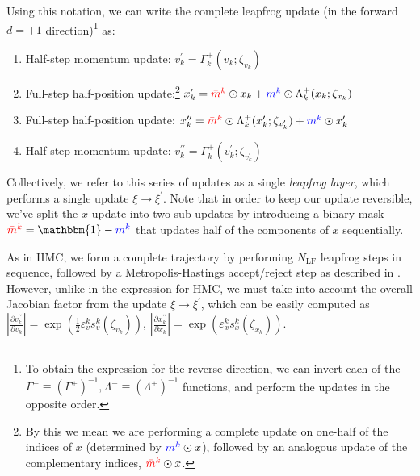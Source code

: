 \documentclass{article} %
\newcommand{\mbart}{\textcolor{red}{\bar{m}^{k}}}
\newcommand{\mt}{\textcolor{blue}{m^{k}}}
\begin{document}
Using this notation, we can write the complete leapfrog update (in the forward \(d=+1\) direction)\footnote{%
   To obtain the expression for the reverse direction, we can invert each of the
   \(\Gamma^{-}\equiv{\left(\Gamma^{+}\right)}^{-1}, \Lambda^{-}\equiv{\left(\Lambda^{+}\right)}^{-1}\) functions, and
   perform the updates in the opposite order.
} as:
%
\begin{enumerate}
   \item Half-step momentum update:%
      \hspace{29pt}\(%
         v^{\prime}_{k} = \Gamma^{+}_{k}(v_{k};\zeta_{v_{k}})%
   \)
   \item Full-step half-position update:\footnote{%
         By this we mean we are performing a complete update on one-half of the indices of \(x\) (determined by
         \(\mt\odot x\)), followed by an analogous update of the complementary indices, \(\mbart\odot x\).
   }
      \hspace{14pt} \(%
         x^{\prime}_{k} = \mbart\odot x_{k} + \mt\odot \Lambda^{+}_{k}(x_{k};\zeta_{x_{k}})
   \)
   \item Full-step half-position update:%
      \hspace{21pt} \(%
         x^{\prime\prime}_{k} = \mbart\odot\Lambda^{+}_{k}(x^{\prime}_{k};\zeta_{x^{\prime}_{k}}) + \mt\odot x^{\prime}_{k}
   \)
   \item Half-step momentum update:%
      \hspace{25pt} \(%
         v^{\prime\prime}_{k} = \Gamma_{k}^{+}(v^{\prime}_{k}; \zeta_{v^{\prime}_{k}})
   \)
\end{enumerate}
%
Collectively, we refer to this series of updates as a single \emph{leapfrog layer}, which performs a single update \(\xi\rightarrow\xi^{\prime}\).
%
Note that in order to keep our update reversible, we've split the \(x\) update into two sub-updates by
introducing a binary mask \(\mbart = \mathbbm{1} - \mt\) that updates half of the components of \(x\) sequentially.
%

As in HMC, we form a complete trajectory by performing \(N_{\mathrm{LF}}\) leapfrog steps in sequence, followed by a Metropolis-Hastings accept/reject step as described in .
%
However, unlike in the expression for HMC, we must take into account the overall Jacobian factor from the update
\(\xi\rightarrow\xi^{\prime}\), which can be easily computed as \(\left|\tfrac{\partial v^{\prime\prime}_{k}}{\partial
   v_{k}}\right| = \exp{\left(\tfrac{1}{2}{\varepsilon^{k}_{v} s^{k}_{v}(\zeta_{v_{k}})}\right)}\),
   \(\left|\tfrac{\partial x^{\prime\prime}_{k}}{\partial x_{k}}\right| = \exp{\left(\varepsilon^{k}_{x} s^{k}_{x}(\zeta_{x_{k}})\right)}\).
%
%
\end{document}
